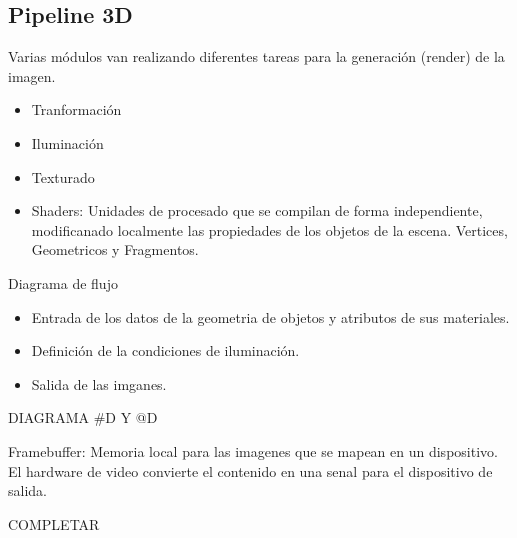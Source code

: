 \documentclass[12pt, twoside, openright]{report} %
\begin{document}
\subsection{Pipeline 3D}
Varias módulos van realizando diferentes tareas para la generación (render) de la imagen.
\begin{itemize}
  \item Tranformación
  \item Iluminación
  \item Texturado
  \item Shaders: Unidades de procesado que se compilan de forma independiente, modificanado localmente las propiedades de los objetos de la escena. Vertices, Geometricos y Fragmentos.
\end{itemize}
Diagrama de flujo
\begin{itemize}
  \item Entrada de los datos de la geometria de objetos y atributos de sus materiales.
  \item Definición de la condiciones de iluminación.
  \item Salida de las imganes.
\end{itemize}
DIAGRAMA #D Y @D

Framebuffer: Memoria local para las imagenes que se mapean en un dispositivo. El hardware de video convierte el contenido en una senal para el dispositivo de salida.

  COMPLETAR
\end{document}

